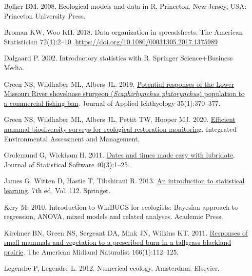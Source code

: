 \documentclass[
  13,
  letterpaper,
]{report}
\newlength{\cslhangindent}
\newenvironment{CSLReferences}[2] %
 {\begin{list}{}{%
  \setlength{\itemindent}{0pt}
  \setlength{\leftmargin}{0pt}
  \setlength{\parsep}{0pt}
  \ifodd #1
   \setlength{\leftmargin}{\cslhangindent}
   \setlength{\itemindent}{-1\cslhangindent}
  \fi
  \setlength{\itemsep}{#2\baselineskip}}}
 {\end{list}}
\begin{document}
\label{refs}
\begin{CSLReferences}{1}{1}
Bolker BM. 2008. Ecological models and data in {R}. Princeton, New
Jersey, USA: Princeton University Press.

Broman KW, Woo KH. 2018. Data organization in spreadsheets. The American
Statistician 72(1):2--10.
\url{https://doi.org/10.1080/00031305.2017.1375989}

Dalgaard P. 2002. Introductory statistics with {R}. Springer
Science+Business Media.

Green NS, Wildhaber ML, Albers JL. 2019.
\href{https://doi.org/10.1111/jai.13701}{Potential responses of the
{L}ower {M}issouri {R}iver shovelnose sturgeon (\emph{{S}caphirhynchus
platorynchus}) population to a commercial fishing ban}. Journal of
Applied Ichthyology 35(1):370--377.

Green NS, Wildhaber ML, Albers JL, Pettit TW, Hooper MJ. 2020.
\href{https://doi.org/10.1002/ieam.4324}{Efficient mammal biodiversity
surveys for ecological restoration monitoring}. Integrated Environmental
Assessment and Management.

Grolemund G, Wickham H. 2011.
\href{https://www.jstatsoft.org/v40/i03/}{Dates and times made easy with
{lubridate}}. Journal of Statistical Software 40(3):1--25.

James G, Witten D, Hastie T, Tibshirani R. 2013.
\href{http://faculty.marshall.usc.edu/gareth-james/ISL/}{An introduction
to statistical learning}. 7th ed. Vol. 112. Springer.

Kéry M. 2010. Introduction to {W}in{BUGS} for ecologists: {B}ayesian
approach to regression, {ANOVA}, mixed models and related analyses.
Academic Press.

Kirchner BN, Green NS, Sergeant DA, Mink JN, Wilkins KT. 2011.
\href{https://doi.org/10.1674/0003-0031-166.1.112}{Responses of small
mammals and vegetation to a prescribed burn in a tallgrass blackland
prairie}. The American Midland Naturalist 166(1):112--125.

Legendre P, Legendre L. 2012. Numerical ecology. Amsterdam: Elsevier.


\end{CSLReferences}
\end{document}
